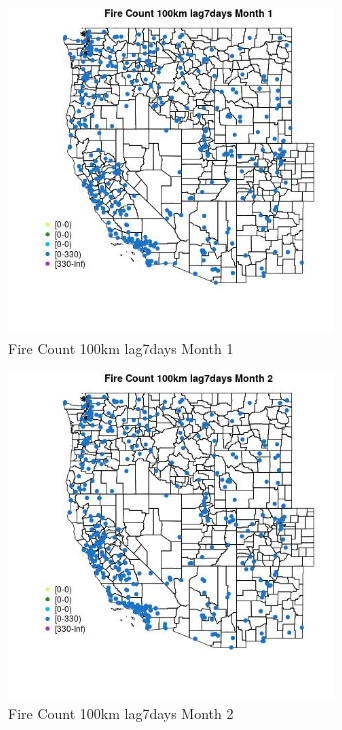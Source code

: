 \begin{figure} 
\centering  
\includegraphics[width=0.77\textwidth]{Code_Outputs/Report_ML_input_PM25_Step4_part_e_de_duplicated_aves_compiled_2019-05-18wNAs_MapObsMo1Fire_Count_100km_lag7days.jpg} 
\caption{\label{fig:Report_ML_input_PM25_Step4_part_e_de_duplicated_aves_compiled_2019-05-18wNAsMapObsMo1Fire_Count_100km_lag7days}Fire Count 100km lag7days Month 1} 
\end{figure} 
 

\clearpage 

\begin{figure} 
\centering  
\includegraphics[width=0.77\textwidth]{Code_Outputs/Report_ML_input_PM25_Step4_part_e_de_duplicated_aves_compiled_2019-05-18wNAs_MapObsMo2Fire_Count_100km_lag7days.jpg} 
\caption{\label{fig:Report_ML_input_PM25_Step4_part_e_de_duplicated_aves_compiled_2019-05-18wNAsMapObsMo2Fire_Count_100km_lag7days}Fire Count 100km lag7days Month 2} 
\end{figure} 
 


